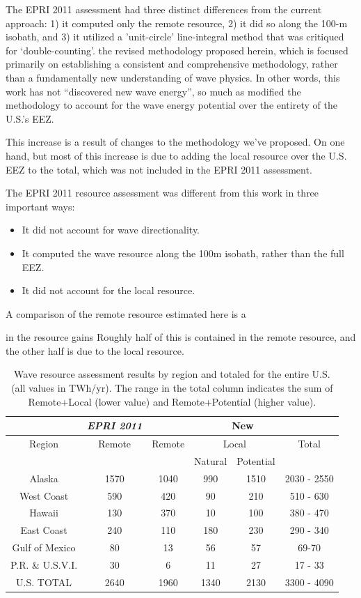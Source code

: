 The EPRI 2011 assessment had three distinct differences from the current approach: 1) it computed only the remote resource, 2) it did so along the 100-m isobath, and 3) it utilized a 'unit-circle' line-integral method that was critiqued for `double-counting'. 
the revised methodology proposed herein, which is focused primarily on establishing a consistent and comprehensive methodology, rather than a fundamentally new understanding of wave physics. In other words, this work has not ``discovered new wave energy'', so much as modified the methodology to account for the wave energy potential over the entirety of the U.S.'s EEZ.

This increase is a result of changes to the methodology we've proposed. On one hand, 
but most of this increase is due to adding the local resource over the U.S. EEZ to the total, which was not included in the EPRI 2011 assessment. 


The EPRI 2011 resource assessment was different from this work in three important ways:
\begin{itemize}
\item It did not account for wave directionality.
\item It computed the wave resource along the 100m isobath, rather than the full EEZ.
\item It did not account for the local resource.
\end{itemize}
A comparison of the remote resource estimated here is a 

in the resource gains Roughly half of this is contained in the remote resource, and the other half is due to the local resource. 

\begin{table}[ht]
  \centering
  \begin{tabular}{|c|c|c|c|c|c|}
    \cline{2-6}
    \multicolumn{1}{c|}{} & {\it EPRI 2011} & \multicolumn{4}{c|}{New} \\
    \hline
    Region & Remote  & Remote & \multicolumn{2}{c|}{Local} & Total \\
    & & & Natural & Potential & \\
    \hline
    Alaska & 1570 & 1040 & 990 & 1510 & 2030 - 2550 \\
    West Coast & 590 & 420 & 90 & 210 & 510 - 630 \\
    Hawaii & 130 & 370 & 10 & 100 & 380 - 470 \\
    East Coast & 240 & 110 & 180 & 230 & 290 - 340 \\
    Gulf of Mexico & 80 & 13 & 56 & 57 & 69-70 \\
    P.R. \& U.S.V.I. & 30 & 6 & 11 & 27 & 17 - 33 \\
    \hline \hline
U.S. TOTAL & 2640 & 1960 & 1340 & 2130 & 3300 - 4090 \\
\hline
  \end{tabular}
  \caption{Wave resource assessment results by region and totaled for the entire U.S. (all values in TWh/yr). The range in the total column indicates the sum of Remote+Local (lower value) and Remote+Potential (higher value). }
  \label{table:totals}
\end{table}

